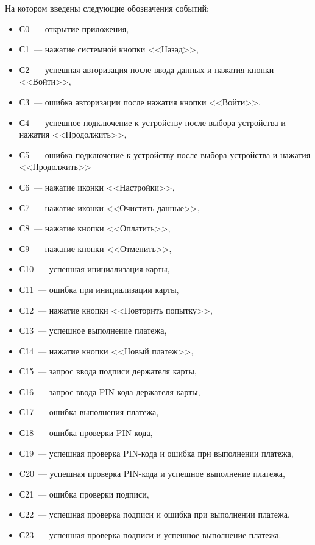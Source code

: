 На котором введены следующие обозначения событий:
\begin{itemize}
    \item С0~--- открытие приложения,
    \item С1~--- нажатие системной кнопки <<Назад>>,
    \item С2~--- успешная авторизация после ввода данных и нажатия кнопки <<Войти>>,
    \item С3~--- ошибка авторизации после нажатия кнопки <<Войти>>,
    \item С4~--- успешное подключение к устройству после выбора устройства и нажатия <<Продолжить>>,
    \item С5~--- ошибка подключение к устройству после выбора устройства и нажатия <<Продолжить>>
    \item С6~--- нажатие иконки <<Настройки>>,
    \item С7~--- нажатие иконки <<Очистить данные>>,
    \item С8~--- нажатие кнопки <<Оплатить>>,
    \item С9~--- нажатие кнопки <<Отменить>>,
    \item С10~--- успешная инициализация карты,
    \item С11~--- ошибка при инициализации карты,
    \item С12~--- нажатие кнопки <<Повторить попытку>>,
    \item С13~--- успешное выполнение платежа,
    \item С14~--- нажатие кнопки <<Новый платеж>>,
    \item С15~--- запрос ввода подписи держателя карты,
    \item С16~--- запрос ввода PIN-кода держателя карты,
    \item С17~--- ошибка выполнения платежа,
    \item С18~--- ошибка проверки PIN-кода,
    \item С19~--- успешная проверка PIN-кода и ошибка при выполнении платежа,
    \item C20~--- успешная проверка PIN-кода и успешное выполнение платежа,
    \item С21~--- ошибка проверки подписи,
    \item С22~--- успешная проверка подписи и ошибка при выполнении платежа,
    \item С23~--- успешная проверка подписи и успешное выполнение платежа.
\end{itemize}


